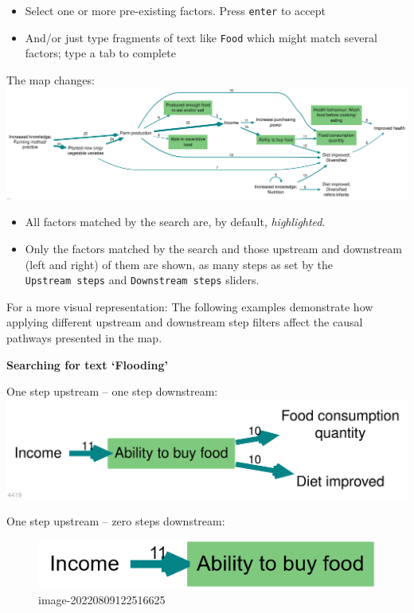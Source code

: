 \documentclass[
]{book}
\providecommand{\tightlist}{%
  \setlength{\itemsep}{0pt}\setlength{\parskip}{0pt}}
\begin{document}
\begin{itemize}
\tightlist
\item
  Select one or more pre-existing factors. Press \texttt{enter} to accept
\item
  And/or just type fragments of text like \texttt{Food} which might match several factors; type a tab to complete
\end{itemize}

The map changes:\includegraphics[width=6.77083in,height=\textheight]{_assets/example-file-2022-08-09 (4).svg}

\begin{itemize}
\tightlist
\item
  All factors matched by the search are, by default, \emph{highlighted}.
\item
  Only the factors matched by the search and those upstream and downstream (left and right) of them are shown, as many steps as set by the \texttt{Upstream\ steps} and \texttt{Downstream\ steps} sliders.
\end{itemize}

For a more visual representation: The following examples demonstrate how applying different upstream and downstream step filters affect the causal pathways presented in the map.

\textbf{Searching for text `Flooding'}

One step upstream -- one step downstream:\includegraphics[width=6.77083in,height=\textheight]{_assets/example-file-2022-08-09 (5).svg}

One step upstream -- zero steps downstream:

\begin{figure}
\centering
\includegraphics[width=6.77083in,height=\textheight]{_assets/image-20220809122516625.png}
\caption{image-20220809122516625}
\end{figure}
\end{document}
